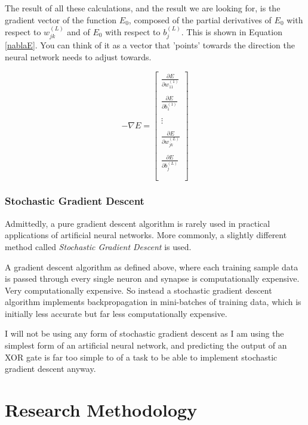 \documentclass[12pt]{article}
\begin{document}
The result of all these calculations, and the result we are looking for, is the gradient vector of the function $E_0$, composed of the partial derivatives of $E_0$ with respect to $w_{jk}^{(L)}$ and of $E_0$ with respect to $b_j^{(L)}$. This is shown in Equation \ref{nablaE}. You can think of it as a vector that 'points' towards the direction the neural network needs to adjust towards.


\begin{equation} \label{nablaE}
  -\nabla E = \begin{bmatrix}
  \frac{\partial E}{\partial w_{11}^{(1)}} \\\\
  \frac{\partial E}{\partial b_1^{(1)}} \\\\
  \vdots \\\\
  \frac{\partial E}{\partial w_{jk}^{(L)}} \\\\
  \frac{\partial E}{\partial b_j^{(L)}} \\\\
  \end{bmatrix}
\end{equation}

\subsubsection{Stochastic Gradient Descent}

Admittedly, a pure gradient descent algorithm is rarely used in practical applications of artificial neural networks. More commonly, a slightly different method called \textit{Stochastic Gradient Descent} is used.

A gradient descent algorithm as defined above, where each training sample data is passed through every single neuron and synapse is computationally expensive. Very computationally expensive. So instead a stochastic gradient descent algorithm implements backpropagation in mini-batches of training data, which is initially less accurate but far less computationally expensive.

I will not be using any form of stochastic gradient descent as I am using the simplest form of an artificial neural network, and predicting the output of an XOR gate is far too simple to of a task to be able to implement stochastic gradient descent anyway.

\section{Research Methodology \label{methodology}}
\end{document}
